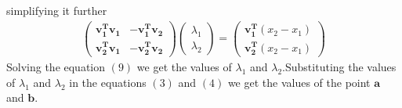 \documentclass[journal,12pt,twocolumn]{IEEEtran}
\begin{document}
simplifying it further\\
\begin{align}
    \begin{pmatrix}\bm{v_1^T}\bm{v_1} & -\bm{v_1^T}\bm{v_2}\\\bm{v_2^T}\bm{v_1} &  -\bm{v_2^T}\bm{v_2}\end{pmatrix}\begin{pmatrix}\lambda_1\\\lambda_2\end{pmatrix}=\begin{pmatrix}\bm{v_1^T}(x_2-x_1)\\\bm{v_2^T}(x_2-x_1)\end{pmatrix}
\end{align}
Solving the equation $(9)$ we get the values of $\lambda_1$ and $\lambda_2$.Substituting the values of $\lambda_1$ and $\lambda_2$ in the equations $(3)$ and $(4)$ we get the values of the point $\bm{a}$ and $\bm{b}$.
\end{document}
